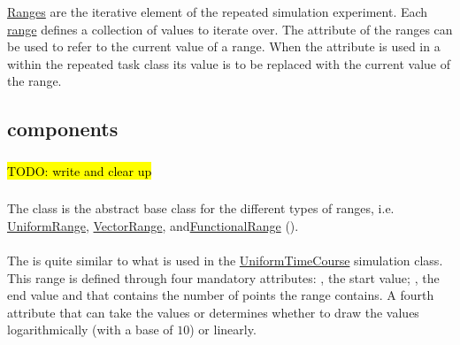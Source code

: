 \hyperref[class:range]{Ranges} are the iterative element of the repeated simulation experiment. Each \hyperref[class:range]{range} defines a collection of values to iterate over. The  attribute of the ranges can be used to refer to the current value of a range. When the  attribute is used in a  within the repeated task class its value is to be replaced with the current value of the range.


\subsection{ components}
\label{class:taskComponents}

\subsubsection{}
\label{class:subtask}
\hl{TODO: write and clear up}

\subsubsection{}
\label{class:range}
The  class is the abstract base class for the different types of ranges, i.e. \hyperref[class:uniformRange]{UniformRange}, \hyperref[class:vectorRange]{VectorRange}, and\hyperref[class:functionalRange]{FunctionalRange} (). 


\paragraph{}
\label{class:uniformRange}
The  is quite similar to what is used in the \hyperref[class:uniformTimeCourse]{UniformTimeCourse} simulation class. This range is defined through four mandatory attributes: , the start value; , the end value and  that contains the number of points the range contains. A fourth attribute  that can take the values  or  determines whether to draw the values logarithmically (with a base of $10$) or linearly.

